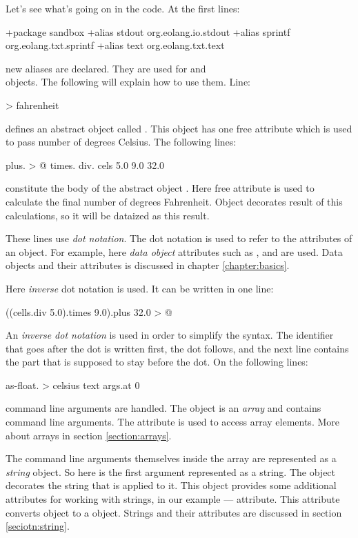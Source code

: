 \documentclass[12pt]{book}
\begin{document}
Let's see what's going on in the code. At the first lines:
\begin{ffcode}
+package sandbox
+alias stdout org.eolang.io.stdout
+alias sprintf org.eolang.txt.sprintf
+alias text org.eolang.txt.text
\end{ffcode}
new aliases are declared. They are used for  and 
\\
 objects. The following will explain how to use them. Line:
\begin{ffcode}
[cels] > fahrenheit
\end{ffcode}
defines an abstract object called . This object has one free attribute  which is used to pass number of degrees Celsius. The following lines:
\begin{ffcode}
plus. > @
  times.
    div.
      cels
      5.0
    9.0
  32.0
\end{ffcode}
constitute the body of the abstract object . Here  free attribute is used to calculate the final number of degrees Fahrenheit. Object  decorates result of this calculations, so it will be dataized as this result.

These lines use \textit{dot notation}. The dot notation is used to refer to the attributes of an object. For example, here  \textit{data object} attributes such as ,  and  are used. Data objects and their attributes is discussed in chapter \ref{chapter:basics}. 

Here \textit{inverse} dot notation is used. It can be written in one line:
\begin{ffcode}
((cells.div 5.0).times 9.0).plus 32.0 > @
\end{ffcode}
An \textit{inverse dot notation} is used in order to simplify the syntax. The identiﬁer that goes after the dot is written ﬁrst, the dot follows, and the next line contains the part that is supposed to stay before the dot.  On the following lines:
\begin{ffcode}
as-float. > celsius
  text
    args.at 0
\end{ffcode}
command line arguments are handled.  The  object is an \textit{array} and contains command line arguments. The attribute  is used to access array elements. More about arrays in section \ref{section:arrays}.

The command line arguments themselves inside the  array are represented as a \textit{string} object.  So here  is the first argument represented as a string. The object  decorates the string that is applied to it. This object provides some additional attributes for working with strings, in our example —  attribute. This attribute converts  object to a  object. Strings and their attributes are discussed in section \ref{seciotn:string}.
\end{document}
